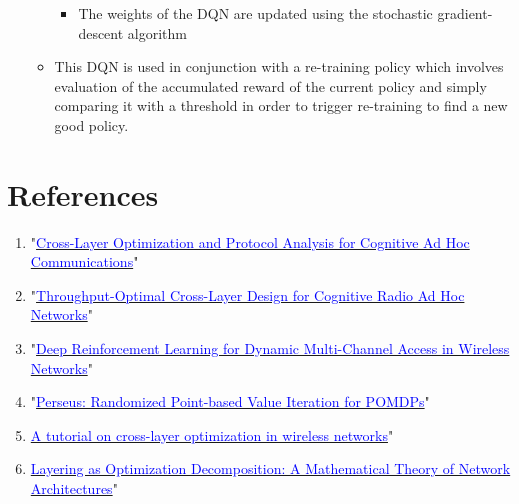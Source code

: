 \documentclass{article}
\begin{document}
\begin{itemize}
\begin{itemize}
\begin{itemize}
            \item The weights of the DQN are updated using the stochastic gradient-descent algorithm
        \end{itemize}
        \item This DQN is used in conjunction with a re-training policy which involves evaluation of the accumulated reward of the current policy and simply comparing it with a threshold in order to trigger re-training to find a new good policy.
    \end{itemize}
\end{itemize}
\section{References}
\begin{enumerate}
    \item "\href{http://ieeexplore.ieee.org/stamp/stamp.jsp?tp=&arnumber=7859326&isnumber=7859429}{\textcolor{blue}{Cross-Layer Optimization and Protocol Analysis for Cognitive Ad Hoc Communications}}"\label{1}
    \item "\href{http://ieeexplore.ieee.org/stamp/stamp.jsp?tp=&arnumber=6881740&isnumber=7180482}{\textcolor{blue}{Throughput-Optimal Cross-Layer Design for Cognitive Radio Ad Hoc Networks}}"\label{2}
    \item "\href{https://ieeexplore.ieee.org/document/8303773}{\textcolor{blue}{Deep Reinforcement Learning for Dynamic Multi-Channel Access in Wireless Networks}}"\label{3}
    \item "\href{https://arxiv.org/pdf/1109.2145.pdf}{\textcolor{blue}{Perseus: Randomized Point-based Value Iteration for POMDPs}}"\label{4}
    \item \href{http://ieeexplore.ieee.org/stamp/stamp.jsp?tp=&arnumber=1665000&isnumber=34851}{\textcolor{blue}{A tutorial on cross-layer optimization in wireless networks}}"
    \item \href{http://ieeexplore.ieee.org/stamp/stamp.jsp?tp=&arnumber=4118456&isnumber=4118453}{\textcolor{blue}{Layering as Optimization Decomposition: A Mathematical Theory of Network Architectures}}"
\end{enumerate}
\end{document}
